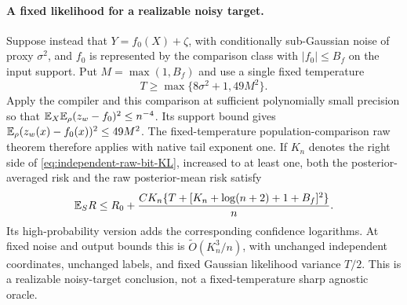 \paragraph{A fixed likelihood for a realizable noisy target.}
Suppose instead that $Y=f_0(X)+\zeta$, with conditionally sub-Gaussian
noise of proxy $\sigma^2$, and $f_0$ is represented by the comparison
class with $|f_0|\le B_f$ on the input support.
Put $M=\max(1,B_f)$ and use a single fixed temperature
\[
 T\ge\max\{8\sigma^2+1,49M^2\}.
\]
Apply the compiler and this comparison at sufficient polynomially
small precision so that
$\mathbb E_X\mathbb E_\rho(z_w-f_0)^2\le n^{-4}$.
Its support bound gives
$\mathbb E_\rho(z_w(x)-f_0(x))^2\le49M^2$.
The fixed-temperature population-comparison raw theorem therefore
applies with native tail exponent one. If $K_n$ denotes the right
side of \eqref{eq:independent-raw-bit-KL}, increased to at least one,
both the posterior-averaged risk and the raw posterior-mean risk
satisfy
\[
 \mathbb E_S R\le R_0+
 \frac{C K_n\{T+[K_n+\log(n+2)+1+B_f]^2\}}n.
\]
Its high-probability version adds the corresponding confidence
logarithms. At fixed noise and output bounds this is
$\widetilde O(K_n^3/n)$, with unchanged independent coordinates,
unchanged labels, and fixed Gaussian likelihood variance $T/2$.
This is a realizable noisy-target conclusion, not a fixed-temperature
sharp agnostic oracle.
